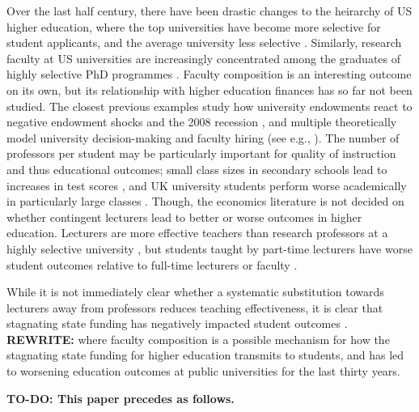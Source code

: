 Over the last half century, there have been drastic changes to the heirarchy of US higher education, where the top universities have become more selective for student applicants, and the average university less selective \citep{hoxby2009changing}.
Similarly, research faculty at US universities are increasingly concentrated among the graduates of highly selective PhD programmes \citep{wapman2022quantifying}.
Faculty composition is an interesting outcome on its own, but its relationship with higher education finances has so far not been studied.
The closest previous examples study  how university endowments react to negative endowment shocks \citep{brown2014endowment} and the 2008 recession \citep{turner2014impact}, and multiple theoretically model university decision-making and faculty hiring (see e.g., \citealt{abe2015implications,johnson2009jep,NBERc13879}).
The number of professors per student may be particularly important for quality of instruction and thus educational outcomes;
small class sizes in secondary schools lead to increases in test scores \citep{angrist1999using}, and UK university students perform worse academically in particularly large classes \citep{bandiera2010heterogeneous}.
Though, the economics literature is not decided on whether contingent lecturers lead to better or worse outcomes in higher education.
Lecturers are more effective teachers than research professors at a highly selective university \citep{bettinger2010does,figlio2015tenure}, but students taught by part-time lecturers have worse student outcomes relative to full-time lecturers or faculty \citep{zhu2021limited,ehrenberg2005tenured}.

While it is not immediately clear whether a systematic substitution towards lecturers away from professors reduces teaching effectiveness, it is clear that stagnating state funding has negatively impacted student outcomes \citep{NBERw23736,NBERw27885}.
\textbf{REWRITE:} where faculty composition is a possible mechanism for how the stagnating state funding for higher education transmits to students, and has led to worsening education outcomes at public universities for the last thirty years.


\textbf{TO-DO:
    This paper precedes as follows.
}
